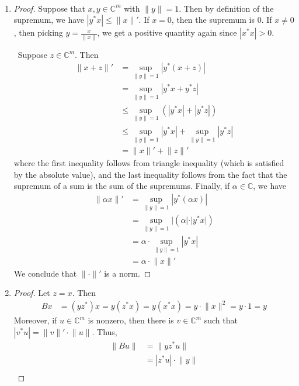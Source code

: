 \documentclass[12pt]{article}
\newenvironment{sol}[1][Solution]{\begin{trivlist}
		\item[\hskip \labelsep {\bfseries #1:}]}{\end{trivlist}}
\begin{document}
\begin{sol}
	\
	\begin{enumerate}[label=(\alph*)]
		\item \begin{proof}
			Suppose that $x,y\in\mathbb{C}^m$ with $\lVert y\rVert=1$. Then by definition of the supremum,
			we have $|y^*x|\leq \lVert x\rVert'$. If $x=0$, then the supremum is 0. If $x\neq 0$, then picking
			$y=\frac{x}{\lVert x\rVert}$, we get a positive quantity again since $|x^*x|>0$.
			
			\
			Suppose $z\in \mathbb{C}^m$. Then
			\begin{align*}
				\lVert x + z\rVert' &= \sup_{\lVert y\rVert =1}|y^*(x+z)|\\
				&=\sup_{\lVert y\rVert =1}|y^*x + y^*z|\\
				&\leq \sup_{\lVert y\rVert=1}\left(|y^*x| + |y^*z|\right)\\
				&\leq \sup_{\lVert y\rVert=1}|y^*x| + \sup_{\lVert y\rVert=1} |y^*z|\\
				&=\lVert x\rVert' + \lVert z\rVert'
			\end{align*}
			where the first inequality follows from triangle inequality (which is satisfied by the absolute
			value), and the last inequality follows from the fact that the supremum of a sum is the sum of the
			supremums. Finally, if $\alpha\in\mathbb{C}$, we have
			\begin{align*}
				\lVert \alpha x\rVert'&=\sup_{\lVert y\rVert=1}|y^*(\alpha x)|\\
				&=\sup_{\lVert y\rVert=1}|(\alpha|\cdot |y^* x|)\\
				&=\alpha\cdot \sup_{\lVert y\rVert=1} |y^*x|\\
				&=\alpha \cdot \lVert x\rVert'
			\end{align*}
			We conclude that $\lVert \cdot\rVert'$ is a norm.
		\end{proof}
		\item \begin{proof}
			Let $z=x$. Then
			\begin{align*}
				Bx &= (yz^*)x =y(z^*x)=y(x^*x)=y\cdot\lVert x\rVert^2=y\cdot 1=y
			\end{align*}
			Moreover, if $u\in \mathbb{C}^m$ is nonzero, then there is $v\in\mathbb{C}^m$ such that
			$|v^*u|=\lVert v\rVert'\cdot \lVert u\rVert$. Thus,
			\begin{align*}
				\lVert Bu\rVert &= \lVert yz^*u\rVert\\
				&=|z^*u|\cdot \lVert y\rVert\\

\end{align*}
\end{proof}
\end{enumerate}
\end{sol}
\end{document}
